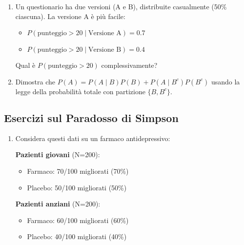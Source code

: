\documentclass[
  italian,
  letterpaper,
  a4paper,
  11pt,
  open=any]{scrbook}
\providecommand{\tightlist}{%
  \setlength{\itemsep}{0pt}\setlength{\parskip}{0pt}}
\theoremstyle{plain}
\theoremstyle{definition}
\theoremstyle{definition}
\theoremstyle{remark}
\begin{document}
\begin{tcolorbox}
\begin{enumerate}
  \begin{itemize}
  \tightlist
  \item
    60\% da medico di base (prevalenza depressione = 10\%)
  \item
    40\% da pronto soccorso (prevalenza depressione = 30\%)
  \end{itemize}

  Qual è la prevalenza complessiva nella clinica?
\item
  Un questionario ha due versioni (A e B), distribuite casualmente (50\%
  ciascuna). La versione A è più facile:

  \begin{itemize}
  \tightlist
  \item
    \(P(\text{punteggio} > 20 \mid \text{Versione A}) = 0.7\)
  \item
    \(P(\text{punteggio} > 20 \mid \text{Versione B}) = 0.4\)
  \end{itemize}

  Qual è \(P(\text{punteggio} > 20)\) complessivamente?
\item
  Dimostra che \(P(A) = P(A \mid B) P(B) + P(A \mid B^c) P(B^c)\) usando
  la legge della probabilità totale con partizione \(\{B, B^c\}\).
\end{enumerate}

\subsection*{Esercizi sul Paradosso di
Simpson}\label{esercizi-sul-paradosso-di-simpson}

\begin{enumerate}
\def\labelenumi{\arabic{enumi}.}
\setcounter{enumi}{17}
\item
  Considera questi dati su un farmaco antidepressivo:

  \textbf{Pazienti giovani} (N=200):

  \begin{itemize}
  \tightlist
  \item
    Farmaco: 70/100 migliorati (70\%)
  \item
    Placebo: 50/100 migliorati (50\%)
  \end{itemize}

  \textbf{Pazienti anziani} (N=200):

  \begin{itemize}
  \tightlist
  \item
    Farmaco: 60/100 migliorati (60\%)
  \item
    Placebo: 40/100 migliorati (40\%)
  \end{itemize}


\end{enumerate}
\end{tcolorbox}
\end{document}
